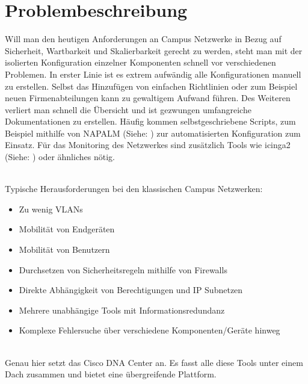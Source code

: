 \section{Problembeschreibung}

Will man den heutigen Anforderungen an Campus Netzwerke in Bezug auf Sicherheit, Wartbarkeit und Skalierbarkeit gerecht zu werden, steht man mit der isolierten Konfiguration einzelner Komponenten schnell vor verschiedenen Problemen. In erster Linie ist es extrem aufwändig alle Konfigurationen manuell zu erstellen. Selbst das Hinzufügen von einfachen Richtlinien oder zum Beispiel neuen Firmenabteilungen kann zu gewaltigem Aufwand führen. Des Weiteren verliert man schnell die Übersicht und ist gezwungen umfangreiche Dokumentationen zu erstellen. Häufig kommen selbstgeschriebene Scripts, zum Beispiel mithilfe von NAPALM (Siehe: \cite{napalm}) zur automatisierten Konfiguration zum Einsatz. Für das Monitoring des Netzwerkes sind zusätzlich Tools wie icinga2  (Siehe: \cite{icinga2}) oder ähnliches nötig. 

~\\
Typische Herausforderungen bei den klassischen Campus Netzwerken:
\begin{itemize}
	\item Zu wenig VLANs
	\item Mobilität von Endgeräten
	\item Mobilität von Benutzern
	\item Durchsetzen von Sicherheitsregeln mithilfe von Firewalls
	\item Direkte Abhängigkeit von Berechtigungen und IP Subnetzen
	\item Mehrere unabhängige Tools mit Informationsredundanz
	\item Komplexe Fehlersuche über verschiedene Komponenten/Geräte hinweg
\end{itemize}

~\\
Genau hier setzt das Cisco DNA Center an. Es fasst alle diese Tools unter einem Dach zusammen und bietet eine übergreifende Plattform. 

